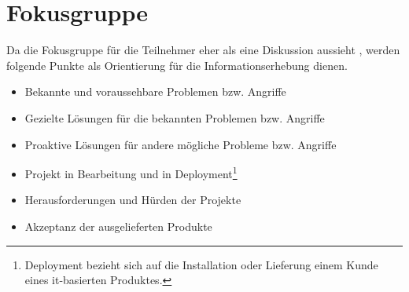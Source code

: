 \section{Fokusgruppe}\label{appendix:focus_gruppe}

Da die Fokusgruppe für die Teilnehmer eher als eine Diskussion aussieht \cite{refbook:APGF}, werden folgende Punkte
als Orientierung für die Informationserhebung dienen.

\begin{itemize}
    \item Bekannte und voraussehbare Problemen bzw. Angriffe
    \item Gezielte Lösungen für die bekannten Problemen bzw. Angriffe
    \item Proaktive Lösungen für andere mögliche Probleme bzw. Angriffe
    \item Projekt in Bearbeitung und in Deployment\footnote{Deployment bezieht sich auf die Installation oder Lieferung
    einem Kunde eines it-basierten Produktes.}
    \item Herausforderungen und Hürden der Projekte
    \item Akzeptanz der ausgelieferten Produkte
\end{itemize}

